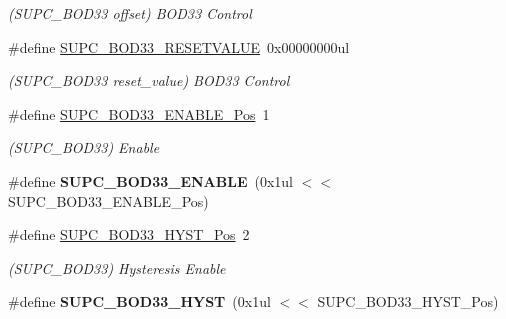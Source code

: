 \begin{DoxyCompactItemize}
\begin{DoxyCompactList}\small\item\em (S\+U\+P\+C\+\_\+\+B\+O\+D33 offset) B\+O\+D33 Control \end{DoxyCompactList}\item 
\hypertarget{group___s_a_m_l21___s_u_p_c_gaba0a023335662f4a3c7efedb5439c0cd}{}\#define \hyperlink{group___s_a_m_l21___s_u_p_c_gaba0a023335662f4a3c7efedb5439c0cd}{S\+U\+P\+C\+\_\+\+B\+O\+D33\+\_\+\+R\+E\+S\+E\+T\+V\+A\+L\+U\+E}~0x00000000ul\label{group___s_a_m_l21___s_u_p_c_gaba0a023335662f4a3c7efedb5439c0cd}

\begin{DoxyCompactList}\small\item\em (S\+U\+P\+C\+\_\+\+B\+O\+D33 reset\+\_\+value) B\+O\+D33 Control \end{DoxyCompactList}\item 
\hypertarget{group___s_a_m_l21___s_u_p_c_ga6c2cdcd3f5977215335972b1df0c0f09}{}\#define \hyperlink{group___s_a_m_l21___s_u_p_c_ga6c2cdcd3f5977215335972b1df0c0f09}{S\+U\+P\+C\+\_\+\+B\+O\+D33\+\_\+\+E\+N\+A\+B\+L\+E\+\_\+\+Pos}~1\label{group___s_a_m_l21___s_u_p_c_ga6c2cdcd3f5977215335972b1df0c0f09}

\begin{DoxyCompactList}\small\item\em (S\+U\+P\+C\+\_\+\+B\+O\+D33) Enable \end{DoxyCompactList}\item 
\hypertarget{group___s_a_m_l21___s_u_p_c_ga27e30203e4099f621d7f8b934d18a50b}{}\#define {\bfseries S\+U\+P\+C\+\_\+\+B\+O\+D33\+\_\+\+E\+N\+A\+B\+L\+E}~(0x1ul $<$$<$ S\+U\+P\+C\+\_\+\+B\+O\+D33\+\_\+\+E\+N\+A\+B\+L\+E\+\_\+\+Pos)\label{group___s_a_m_l21___s_u_p_c_ga27e30203e4099f621d7f8b934d18a50b}

\item 
\hypertarget{group___s_a_m_l21___s_u_p_c_ga40994235f4a9f35dbb33c7ff867f432f}{}\#define \hyperlink{group___s_a_m_l21___s_u_p_c_ga40994235f4a9f35dbb33c7ff867f432f}{S\+U\+P\+C\+\_\+\+B\+O\+D33\+\_\+\+H\+Y\+S\+T\+\_\+\+Pos}~2\label{group___s_a_m_l21___s_u_p_c_ga40994235f4a9f35dbb33c7ff867f432f}

\begin{DoxyCompactList}\small\item\em (S\+U\+P\+C\+\_\+\+B\+O\+D33) Hysteresis Enable \end{DoxyCompactList}\item 
\hypertarget{group___s_a_m_l21___s_u_p_c_gaa77fb37e84c5d7e749a76650ee002c9f}{}\#define {\bfseries S\+U\+P\+C\+\_\+\+B\+O\+D33\+\_\+\+H\+Y\+S\+T}~(0x1ul $<$$<$ S\+U\+P\+C\+\_\+\+B\+O\+D33\+\_\+\+H\+Y\+S\+T\+\_\+\+Pos)\label{group___s_a_m_l21___s_u_p_c_gaa77fb37e84c5d7e749a76650ee002c9f}


\end{DoxyCompactItemize}
